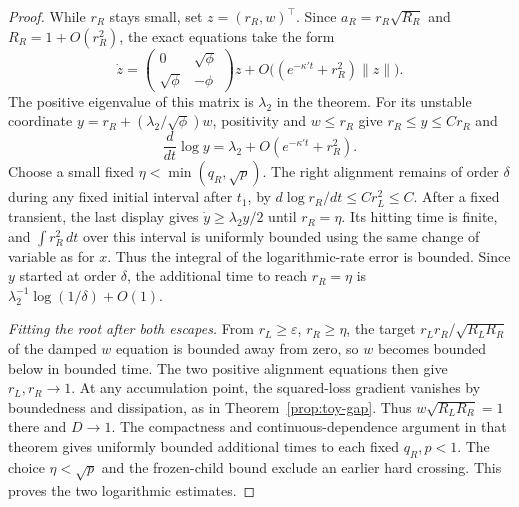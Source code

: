 \begin{proof}
While $r_R$ stays small, set $z=(r_R,w)^\top$. Since $a_R=r_R\sqrt{R_R}$
and $R_R=1+O(r_R^2)$, the exact equations take the form
\[
 \dot z=
 \begin{pmatrix}0&\sqrt\phi\\ \sqrt\phi&-\phi\end{pmatrix}z
 +O\big((e^{-\kappa't}+r_R^2)\|z\|\big).
\]
The positive eigenvalue of this matrix is $\lambda_2$ in the theorem.
For its unstable coordinate $y=r_R+(\lambda_2/\sqrt\phi)w$,
positivity and $w\le r_R$ give $r_R\le y\le C r_R$ and
\[
 \frac{d}{dt}\log y=\lambda_2+O(e^{-\kappa't}+r_R^2).
\]
Choose a small fixed $\eta<\min(q_R,\sqrt p)$.
The right alignment remains of order $\delta$ during any fixed initial
interval after $t_1$, by $d\log r_R/dt\le C r_L^2\le C$. After a fixed
transient, the last display gives $\dot y\ge\lambda_2 y/2$ until
$r_R=\eta$. Its hitting time is finite, and $\int r_R^2\,dt$ over
this interval is uniformly bounded using the same change of variable
as for $x$. Thus the integral of the logarithmic-rate error is bounded.
Since $y$ started at order $\delta$, the additional time to reach
$r_R=\eta$ is $\lambda_2^{-1}\log(1/\delta)+O(1)$.

\emph{Fitting the root after both escapes.}
From $r_L\ge\varepsilon$, $r_R\ge\eta$, the target
$r_Lr_R/\sqrt{R_LR_R}$ of the damped $w$ equation is bounded away from
zero, so $w$ becomes bounded below in bounded time. The two positive
alignment equations then give $r_L,r_R\to1$. At any accumulation point,
the squared-loss gradient vanishes by boundedness and dissipation, as in
Theorem~\ref{prop:toy-gap}. Thus $w\sqrt{R_LR_R}=1$ there and $D\to1$.
The compactness and continuous-dependence argument in that theorem gives
uniformly bounded additional times to each fixed $q_R,p<1$. The choice
$\eta<\sqrt p$ and the frozen-child bound exclude an earlier hard
crossing. This proves the two logarithmic estimates.


\end{proof}
